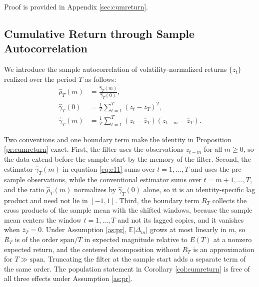 \documentclass[hidelinks]{siamonline250211}
\newcommand{\spn}{\mathrm{span}}
\begin{document}
Proof is provided in Appendix \ref{sec:cumreturn}.




\subsection{Cumulative Return through Sample Autocorrelation}


We introduce the sample autocorrelation of volatility-normalized returns $\{z_{t}\}$ realized over the period $T$ as follows:
\begin{equation} \label{eq:e11} 
	\begin{split}
		\hat{\rho}_{T}(m) & = \frac{\hat{\gamma}_{T}(m)}{\hat{\gamma}_{T}(0)},\\
		\hat{\gamma}_{T}(0)  & = \frac{1}{T} \sum^{T}_{t=1} \left( z_{t} -\overline{z}_{T}\right)^{2}, \\
		\hat{\gamma}_{T}(m)  & = \frac{1}{T} \sum^{T}_{t=1} \left(z_{t}-\overline{z}_{T}\right) \left(z_{t-m}-\overline{z}_{T}\right).
	\end{split}
\end{equation}

Two conventions and one boundary term make the identity in Proposition \ref{pr:cumreturn} exact. First, the filter uses the observations $z_{t-m}$ for all $m\geq 0$, so the data extend before the sample start by the memory of the filter. Second, the estimator $\hat{\gamma}_{T}(m)$ in equation \eqref{eq:e11} sums over $t=1,\ldots,T$ and uses the pre-sample observations, while the conventional estimator sums over $t=m+1,\ldots,T$, and the ratio $\hat{\rho}_{T}(m)$ normalizes by $\hat{\gamma}_{T}(0)$ alone, so it is an identity-specific lag product and need not lie in $[-1,1]$. Third, the boundary term $R_{T}$ collects the cross products of the sample mean with the shifted windows, because the sample mean centers the window $t=1,\ldots,T$ and not its lagged copies, and it vanishes when $\overline{z}_{T}=0$. Under Assumption \ref{as:pr}, $\mathbb{E}\left|\Delta_{m}\right|$ grows at most linearly in $m$, so $R_{T}$ is of the order $\spn/T$ in expected magnitude relative to $E(T)$ at a nonzero expected return, and the centered decomposition without $R_{T}$ is an approximation for $T \gg \spn$. Truncating the filter at the sample start adds a separate term of the same order. The population statement in Corollary \ref{col:cumreturn} is free of all three effects under Assumption \ref{as:pr}.
\end{document}
